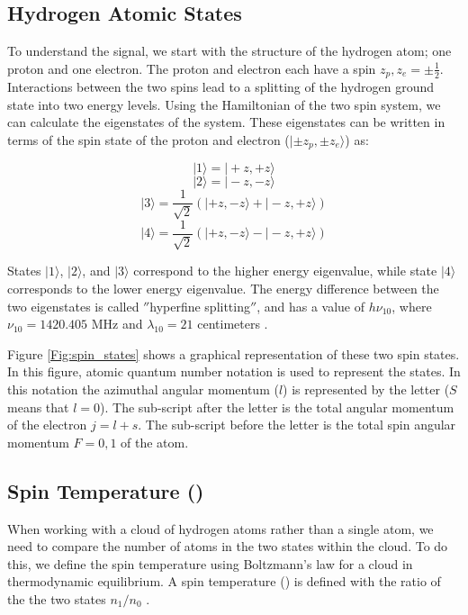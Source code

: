 \subsection{Hydrogen Atomic States}
To understand the \cm signal, we start with the structure of the hydrogen atom; one proton and one electron. The proton and electron each have a spin $z_p,z_e = \pm \frac{1}{2}$. Interactions between the two spins lead to a splitting of the hydrogen ground state into two energy levels. Using the Hamiltonian of the two spin system, we can calculate the eigenstates of the system. These eigenstates can be written in terms of the spin state of the proton and electron ($| \pm z_p, \pm z_e \rangle$) as:

\begin{equation}
| 1 \rangle = | + z , + z \rangle 
\end{equation}
\begin{equation}
| 2 \rangle = | - z, - z \rangle 
\end{equation}
\begin{equation}
| 3 \rangle = \frac{1}{\sqrt{2}} (| + z, - z \rangle + |-z, +z \rangle) 
\end{equation}
\begin{equation}
| 4 \rangle = \frac{1}{\sqrt{2}} (| + z, - z \rangle - |-z, +z \rangle)
\end{equation}


States $| 1 \rangle$, $| 2 \rangle$, and $| 3 \rangle$ correspond to the higher energy eigenvalue, while state $| 4 \rangle$ corresponds to the lower energy eigenvalue. The energy difference between the two eigenstates is called $''$hyperfine splitting$''$, and has a value of $h \nu_{10}$, where $\nu_{10}=1420.405$ MHz and $\lambda_{10} =  21$ centimeters \cite{townsend2000}. 

Figure \ref{Fig:spin_states} shows a graphical representation of these two spin states. In this figure, atomic quantum number notation is used to represent the states. In this notation the azimuthal angular momentum ($l$) is represented by the letter ($S$ means that $l=0$). The sub-script after the letter is the total angular momentum of the electron $j=l+s$. The sub-script before the letter is the total spin angular momentum $F=0,1$ of the atom. 

\subsection{Spin Temperature (\ts)}
When working with a cloud of hydrogen atoms rather than a single atom, we need to compare the number of atoms in the two states within the cloud. To do this, we define the spin temperature using Boltzmann's law for a cloud in thermodynamic equilibrium. A spin temperature (\ts) is defined with the ratio of the the two states $n_1/n_0$ \cite{field_1958}. 

